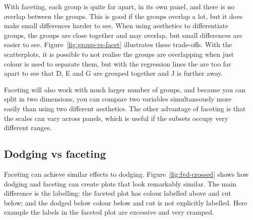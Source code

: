 With faceting, each group is quite far apart, in its own panel, and there is no overlap between the groups.  This is good if the groups overlap a lot, but it does make small differences harder to see.  When using aesthetics to differentiate groups, the groups are close together and may overlap, but small differences are easier to see.  Figure~\ref{fig:group-vs-facet} illustrates these trade-offs.  With the scatterplots, it is possible to not realise the groups are overlapping when just colour is used to separate them, but with the regression lines the are too far apart to see that D, E and G are grouped together and J is further away.

Faceting will also work with much larger number of groups, and because you can split in two dimensions, you can compare two variables simultaneously more easily than using two different aesthetics.  The other advantage of faceting is that the scales can vary across panels, which is useful if the subsets occupy very different ranges.

% 
%
% 


\subsection{Dodging vs faceting}
\label{sub:dodge-vs-facet}

Faceting can achieve similar effects to dodging.  Figure~\ref{fig:fvd-crossed} shows how dodging and faceting can create plots that look remarkably similar.  The main difference is the labelling: the faceted plot has colour labelled above and cut below; and the dodged below colour below and cut is not explicitly labelled.  Here example the labels in the faceted plot are excessive and very cramped.  

